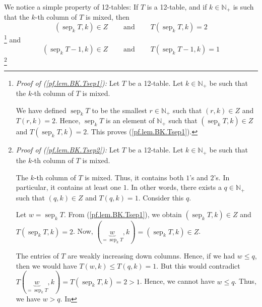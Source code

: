 \documentclass[numbers=enddot,12pt,final,onecolumn,notitlepage]{scrartcl}%
\theoremstyle{definition}
\newenvironment{verlong}{}{}
\begin{document}
\begin{verlong}
We notice a simple property of 12-tables: If $T$ is a 12-table, and if
$k\in\mathbb{N}_{+}$ is such that the $k$-th column of $T$ is mixed, then%
\begin{equation}
\left(  \operatorname*{sep}\nolimits_{k}T,k\right)  \in
Z\ \ \ \ \ \ \ \ \ \ \text{and}\ \ \ \ \ \ \ \ \ \ T\left(
\operatorname*{sep}\nolimits_{k}T,k\right)  =2 \label{pf.lem.BK.Tsep1}%
\end{equation}
\footnote{\textit{Proof of (\ref{pf.lem.BK.Tsep1}):} Let $T$ be a 12-table.
Let $k\in\mathbb{N}_{+}$ be such that the $k$-th column of $T$ is mixed.
\par
We have defined $\operatorname*{sep}\nolimits_{k}T$ to be the smallest
$r\in\mathbb{N}_{+}$ such that $\left(  r,k\right)  \in Z$ and $T\left(
r,k\right)  =2$. Hence, $\operatorname*{sep}\nolimits_{k}T$ is an element of
$\mathbb{N}_{+}$ such that $\left(  \operatorname*{sep}\nolimits_{k}%
T,k\right)  \in Z$ and $T\left(  \operatorname*{sep}\nolimits_{k}T,k\right)
=2$. This proves (\ref{pf.lem.BK.Tsep1}).} and%
\begin{equation}
\left(  \operatorname*{sep}\nolimits_{k}T-1,k\right)  \in
Z\ \ \ \ \ \ \ \ \ \ \text{and}\ \ \ \ \ \ \ \ \ \ T\left(
\operatorname*{sep}\nolimits_{k}T-1,k\right)  =1 \label{pf.lem.BK.Tsep2}%
\end{equation}
\footnote{\textit{Proof of (\ref{pf.lem.BK.Tsep2}):} Let $T$ be a 12-table.
Let $k\in\mathbb{N}_{+}$ be such that the $k$-th column of $T$ is mixed.
\par
The $k$-th column of $T$ is mixed. Thus, it contains both $1$'s and $2$'s. In
particular, it contains at least one $1$. In other words, there exists a
$q\in\mathbb{N}_{+}$ such that $\left(  q,k\right)  \in Z$ and $T\left(
q,k\right)  =1$. Consider this $q$.
\par
Let $w=\operatorname*{sep}\nolimits_{k}T$. From (\ref{pf.lem.BK.Tsep1}), we
obtain $\left(  \operatorname*{sep}\nolimits_{k}T,k\right)  \in Z$ and
$T\left(  \operatorname*{sep}\nolimits_{k}T,k\right)  =2$. Now, $\left(
\underbrace{w}_{=\operatorname*{sep}\nolimits_{k}T},k\right)  =\left(
\operatorname*{sep}\nolimits_{k}T,k\right)  \in Z$.
\par
The entries of $T$ are weakly increasing down columns. Hence, if we had $w\leq
q$, then we would have $T\left(  w,k\right)  \leq T\left(  q,k\right)  =1$.
But this would contradict $T\left(  \underbrace{w}_{=\operatorname*{sep}%
\nolimits_{k}T},k\right)  =T\left(  \operatorname*{sep}\nolimits_{k}%
T,k\right)  =2>1$. Hence, we cannot have $w\leq q$. Thus, we have $w>q$. In
}
\end{verlong}
\end{document}
